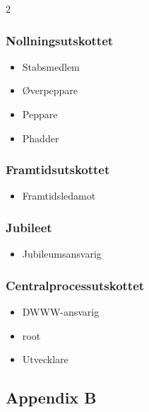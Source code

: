 \documentclass{dsekprotokoll}
\begin{document}
\begin{multicols}{2}
    \subsubsection*{Nollningsutskottet}
    \begin{itemize}
        \item Stabsmedlem
        \item Øverpeppare
        \item Peppare
        \item Phadder
    \end{itemize}

    \subsubsection*{Framtidsutskottet}
    \begin{itemize}
        \item Framtidsledamot
    \end{itemize}

    \subsubsection*{Jubileet}
    \begin{itemize}
        \item Jubileumsansvarig
    \end{itemize}

    \subsubsection*{Centralprocessutskottet}
    \begin{itemize}

        \item DWWW-ansvarig
        \item root
        \item Utvecklare
    \end{itemize}
\end{multicols}

\pagebreak
\subsection*{Appendix B}
\end{document}
